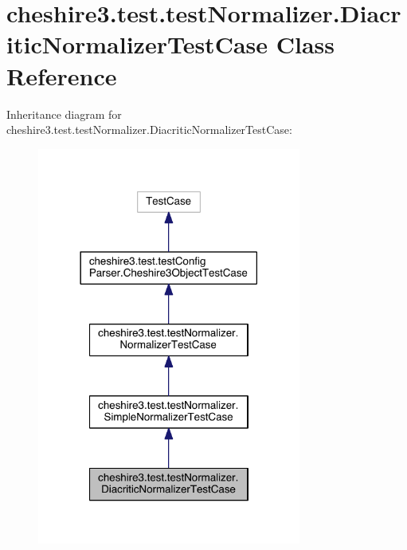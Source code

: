 \hypertarget{classcheshire3_1_1test_1_1test_normalizer_1_1_diacritic_normalizer_test_case}{\section{cheshire3.\-test.\-test\-Normalizer.\-Diacritic\-Normalizer\-Test\-Case Class Reference}
\label{classcheshire3_1_1test_1_1test_normalizer_1_1_diacritic_normalizer_test_case}
}


Inheritance diagram for cheshire3.\-test.\-test\-Normalizer.\-Diacritic\-Normalizer\-Test\-Case\-:
\nopagebreak
\begin{figure}[H]
\begin{center}
\leavevmode
\includegraphics[width=246pt]{classcheshire3_1_1test_1_1test_normalizer_1_1_diacritic_normalizer_test_case__inherit__graph}
\end{center}
\end{figure}


